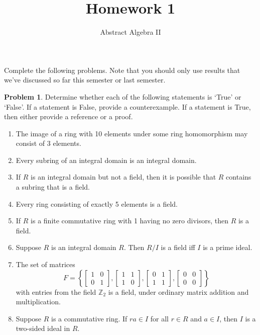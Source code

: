 \documentclass[11pt]{scrartcl}
\theoremstyle{definition}
\newtheorem{problem}[theorem]{Problem}
\begin{document}
\title{Homework 1}
\subtitle{Abstract Algebra II}
\date{}

\maketitle
\thispagestyle{fancy}

Complete the following problems. Note that you should only use results that we've discussed so far this semester or last semester.

\begin{problem}
Determine whether each of the following statements is `True' or `False'.  If a statement is False, provide a counterexample.  If a statement is True, then either provide a reference or a proof.

\begin{enumerate}[label=\rm{(\alph*)}]
\item The image of a ring with 10 elements under some ring homomorphism may consist of 3 elements.
\item Every subring of an integral domain is an integral domain.
\item If $R$ is an integral domain but not a field, then it is possible that $R$ contains a subring that is a field.
\item Every ring consisting of exactly 5 elements is a field.
\item If $R$ is a finite commutative ring with 1 having no zero divisors, then $R$ is a field.
\item Suppose $R$ is an integral domain $R$. Then $R/I$ is a field iff $I$ is a prime ideal.
\item The set of matrices
\[
F=\left\{\begin{bmatrix}
1 & 0\\
0 & 1
\end{bmatrix},
\begin{bmatrix}
1 & 1\\
1 & 0
\end{bmatrix},
\begin{bmatrix}
0 & 1\\
1 & 1
\end{bmatrix},
\begin{bmatrix}
0 & 0\\
0 & 0
\end{bmatrix}
\right\}
\]
with entries from the field $\mathbb{Z}_2$ is a field, under ordinary matrix addition and multiplication.
\item Suppose $R$ is a commutative ring.  If $ra\in I$ for all $r\in R$ and $a\in I$, then $I$ is a two-sided ideal in $R$.
\end{enumerate}
\end{problem}
\end{document}

